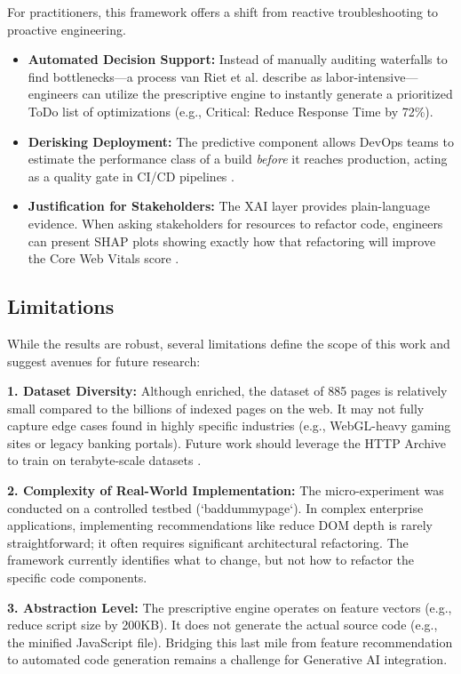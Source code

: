 \documentclass[sn-nature]{sn-jnl}
\begin{document}
For practitioners, this framework offers a shift from reactive troubleshooting to proactive engineering.
\begin{itemize}
    \item \textbf{Automated Decision Support:} Instead of manually auditing waterfalls to find bottlenecks—a process van Riet et al. \cite{vanriet2023} describe as labor-intensive—engineers can utilize the prescriptive engine to instantly generate a prioritized ToDo list of optimizations (e.g., Critical: Reduce Response Time by 72\%).
    \item \textbf{Derisking Deployment:} The predictive component allows DevOps teams to estimate the performance class of a build \textit{before} it reaches production, acting as a quality gate in CI/CD pipelines \cite{dakic2025}.
    \item \textbf{Justification for Stakeholders:} The XAI layer provides plain-language evidence. When asking stakeholders for resources to refactor code, engineers can present SHAP plots showing exactly how that refactoring will improve the Core Web Vitals score \cite{hassija2024}.
\end{itemize}

\subsection{Limitations}

While the results are robust, several limitations define the scope of this work and suggest avenues for future research:

\textbf{1. Dataset Diversity:} Although enriched, the dataset of 885 pages is relatively small compared to the billions of indexed pages on the web. It may not fully capture edge cases found in highly specific industries (e.g., WebGL-heavy gaming sites or legacy banking portals). Future work should leverage the HTTP Archive to train on terabyte-scale datasets \cite{huang2023}.

\textbf{2. Complexity of Real-World Implementation:} The micro-experiment was conducted on a controlled testbed (`baddummypage`). In complex enterprise applications, implementing recommendations like reduce DOM depth is rarely straightforward; it often requires significant architectural refactoring. The framework currently identifies what to change, but not how to refactor the specific code components.

\textbf{3. Abstraction Level:} The prescriptive engine operates on feature vectors (e.g., reduce script size by 200KB). It does not generate the actual source code (e.g., the minified JavaScript file). Bridging this last mile from feature recommendation to automated code generation remains a challenge for Generative AI integration.
\end{document}
